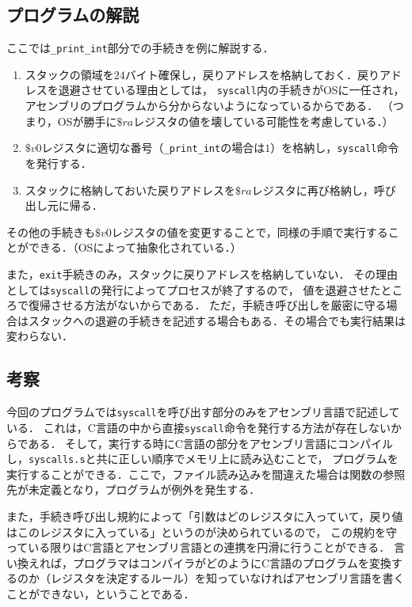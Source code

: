 \documentclass[a4j,11pt]{jarticle}
\begin{document}
\subsection{プログラムの解説}
ここでは{\tt \_print\_int}部分での手続きを例に解説する．
\begin{enumerate}
      \item スタックの領域を$24$バイト確保し，戻りアドレスを格納しておく．戻りアドレスを退避させている理由としては，
      {\tt syscall}内の手続きがOSに一任され，アセンブリのプログラムから分からないようになっているからである．
      （つまり，OSが勝手に$\$ra$レジスタの値を壊している可能性を考慮している．）
      \item $\$v0$レジスタに適切な番号（{\tt \_print\_int}の場合は$1$）を格納し，{\tt syscall}命令を発行する．
      \item スタックに格納しておいた戻りアドレスを$\$ra$レジスタに再び格納し，呼び出し元に帰る．
\end{enumerate}

その他の手続きも$\$v0$レジスタの値を変更することで，同様の手順で実行することができる．（OSによって抽象化されている．）

また，{\tt exit}手続きのみ，スタックに戻りアドレスを格納していない．
その理由としては{\tt syscall}の発行によってプロセスが終了するので，
値を退避させたところで復帰させる方法がないからである．
ただ，手続き呼び出しを厳密に守る場合はスタックへの退避の手続きを記述する場合もある．その場合でも実行結果は変わらない．

\subsection{考察}

今回のプログラムでは{\tt syscall}を呼び出す部分のみをアセンブリ言語で記述している．
これは，C言語の中から直接{\tt syscall}命令を発行する方法が存在しないからである．
そして，実行する時にC言語の部分をアセンブリ言語にコンパイルし，{\tt syscalls.s}と共に正しい順序でメモリ上に読み込むことで，
プログラムを実行することができる．ここで，ファイル読み込みを間違えた場合は関数の参照先が未定義となり，プログラムが例外を発生する．

また，手続き呼び出し規約によって「引数はどのレジスタに入っていて，戻り値はこのレジスタに入っている」というのが決められているので，
この規約を守っている限りはC言語とアセンブリ言語との連携を円滑に行うことができる．
言い換えれば，プログラマはコンパイラがどのようにC言語のプログラムを変換するのか（レジスタを決定するルール）を知っていなければアセンブリ言語を書くことができない，ということである．
\end{document}
